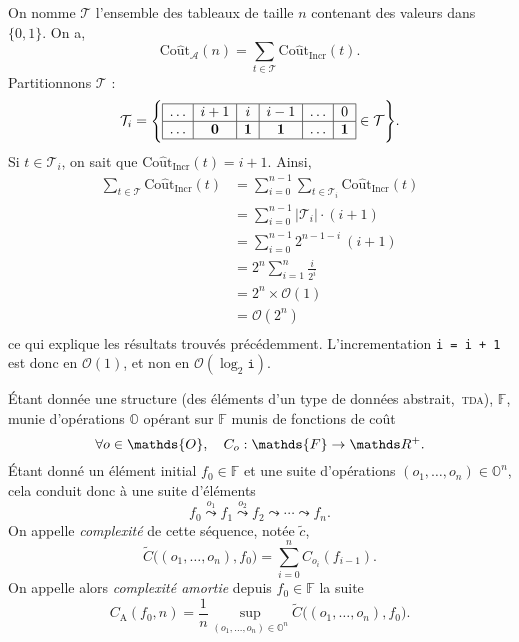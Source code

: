 \documentclass[a4paper]{article}
\begin{document}
	On nomme $\mathcal{T}$\/ l'ensemble des tableaux de taille $n$\/ contenant des valeurs dans $\{0,1\}$. On a, \[
		\mathrm{Co\hat ut}_\mathcal{A}(n) = \sum_{t \in \mathcal{T}} \mathrm{Co\hat ut}_\text{Incr}(t)
	.\]Partitionnons $\mathcal{T}$\/ : \[
		\mathcal{T}_i = \Bigg\{
			\begin{array}{|c|c|c|c|c|c|}
				\hline
				\ldots & i + 1 & i & i - 1 & \ldots & 0\\ \hline
				\ldots & \mathbf{0} & \mathbf{1} & \mathbf{1} & \ldots & \mathbf{1}\\ \hline
			\end{array} \in \mathcal{T}
		\Bigg\}
	.\]  Si $t \in \mathcal{T}_i$, on sait que $\mathrm{Co\hat ut}_\text{Incr}(t) = i + 1$.
	Ainsi,
	\begin{align*}
		\sum_{t \in \mathcal{T}} \mathrm{Co\hat ut}_\text{Incr}(t)
		&= \sum_{i=0}^{n-1} \sum_{t \in \mathcal{T}_i} \mathrm{Co\hat ut}_\text{Incr}(t) \\
		&= \sum_{i=0}^{n-1} |\mathcal{T}_i| \cdot (i + 1) \\
		&= \sum_{i=0}^{n-1} 2^{n - 1 - i}\:(i+1) \\
		&= 2^n \sum_{i=1}^n \frac{i}{2^i}\\
		&= 2^n \times \mathcal{O}(1) \\
		&= \mathcal{O}(2^n) \\
	\end{align*}
	ce qui explique les résultats trouvés précédemment.
	L'incrementation \texttt{i = i + 1} est donc en $\mathcal{O}(1)$, et non en $\mathcal{O}(\log_2 \texttt{i})$.

	\begin{defn}
		Étant donnée une structure (des éléments d'un type de données abstrait,~\textsc{tda}), $\mathds{F}$, munie d'opérations $\mathds{O}$ opérant sur $\mathds{F}$\/ munis de fonctions de coût \[
			\forall o \in \mathds{O}, \quad C_o : \mathds{F} \to \R^+
		.\]
		Étant donné un élément initial $f_0 \in \mathds{F}$\/ et une suite d'opérations $(o_1, \ldots, o_n) \in \mathds{O}^n$, cela conduit donc à une suite d'éléments \[
			f_0 \overset{o_1}\leadsto f_1 \overset{o_2}\leadsto f_2 \leadsto \cdots \leadsto f_n.
		\] On appelle \textit{complexité} de cette séquence, notée $\tilde c$, \[
			\tilde C\big((o_1, \ldots, o_n), f_0\big)  = \sum_{i=0}^n C_{o_i}(f_{i-1})
		.\]
		On appelle alors \textit{complexité amortie} depuis $f_0 \in \mathds{F}$\/ la suite \[
			C_\mathrm{A}(f_0, n) = \frac{1}{n} \sup_{(o_1, \ldots, o_n) \in \mathds{O}^n} \tilde C\big((o_1, \ldots, o_n), f_0\big)
		.\]
	\end{defn}
\end{document}
